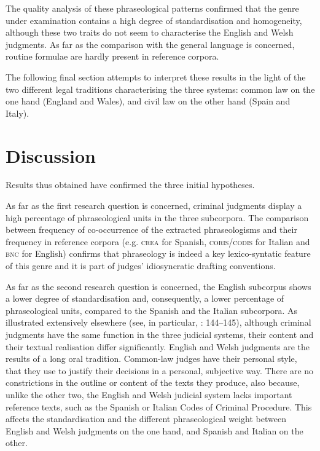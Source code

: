 \documentclass[output=paper]{LSP/langsci}
\begin{document}
The quality analysis of these phraseological patterns \citep[255--261]{
Pontrandolfo2013b} confirmed that the genre under examination contains a high degree of standardisation and homogeneity, although these two traits do not seem to characterise the English and Welsh judgments. As far as the comparison with the general language is concerned, routine formulae are hardly present in reference corpora.

The following final section attempts to interpret these results in the light of the two different legal traditions characterising the three systems: common law on the one hand (England and Wales), and civil law on the other hand (Spain and Italy).

\section{Discussion} \label{sec:6:7}
Results thus obtained have confirmed the three initial hypotheses.

As far as the first research question is concerned, criminal judgments display a high percentage of phraseological units in the three subcorpora. The comparison between frequency of co-occurrence of the extracted phraseologisms and their frequency in reference corpora (e.g. \textsc{crea} for Spanish, \textsc{coris}/\textsc{codis} for Italian and \textsc{bnc} for English) confirms that phraseology is indeed a key lexico-syntatic feature of this genre and it is part of judges’ idiosyncratic drafting conventions.
 
As far as the second research question is concerned, the English subcorpus shows a lower degree of standardisation and, consequently, a lower percentage of phraseological units, compared to the Spanish and the Italian subcorpora. As illustrated extensively elsewhere (see, in particular, \citealt{Pontrandolfo2013a}: 144--145), although criminal judgments have the same function in the three judicial systems, their content and their textual realisation differ significantly. English and Welsh judgments are the results of a long oral tradition. Common-law judges have their personal style, that they use to justify their decisions in a personal, subjective way. There are no constrictions in the outline or content of the texts they produce, also because, unlike the other two, the English and Welsh judicial system lacks important reference texts, such as the Spanish or Italian Codes of Criminal Procedure. This affects the standardisation and the different phraseological weight between English and Welsh judgments on the one hand, and Spanish and Italian on the other.
\end{document}
